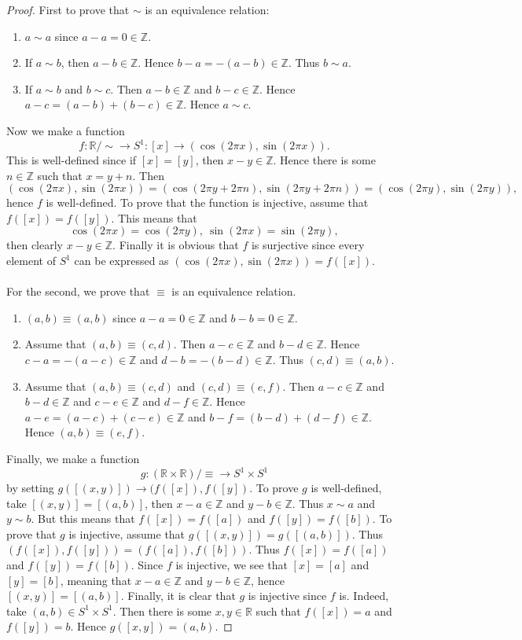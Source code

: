 \documentclass[a4paper, 11pt]{book}
\theoremstyle{plain}
\theoremstyle{plain}
\begin{document}
\begin{proof}
First to prove that $\sim$ is an equivalence relation:
\begin{enumerate}
\item $a\sim a$ since $a-a=0\in \mathbb{Z}$.
\item If $a\sim b$, then $a-b\in \mathbb{Z}$. Hence $b-a = -(a-b)\in \mathbb{Z}$. Thus $b\sim a$.
\item If $a\sim b$ and $b\sim c$. Then $a-b\in \mathbb{Z}$ and $b-c\in \mathbb{Z}$. Hence $a-c=(a-b)+(b-c)\in \mathbb{Z}$. Hence $a\sim c$.
\end{enumerate}
Now we make a function
$$f:\mathbb{R}/\sim\rightarrow S^1:[x]\rightarrow (\cos(2\pi x), \sin(2\pi x)).$$
This is well-defined since if $[x]=[y]$, then $x-y\in \mathbb{Z}$. Hence there is some $n\in \mathbb{Z}$ such that $x=y+n$. Then
$$(\cos(2\pi x), \sin(2\pi x)) = (\cos(2\pi y + 2\pi n), \sin(2\pi y  + 2\pi n)) = (\cos(2\pi y), \sin(2\pi y)),$$
hence $f$ is well-defined. To prove that the function is injective, assume that $f([x]) = f([y])$. This means that 
$$\cos(2\pi x) = \cos(2\pi y),~\sin(2\pi x) = \sin(2\pi y),$$
then clearly $x-y\in \mathbb{Z}$. Finally it is obvious that $f$ is surjective since every element of $S^1$ can be expressed as $(\cos(2\pi x), \sin(2\pi x)) = f([x])$.\\\\

For the second, we prove that $\equiv$ is an equivalence relation.
\begin{enumerate}
\item $(a,b)\equiv (a,b)$ since $a-a=0\in \mathbb{Z}$ and $b-b=0\in \mathbb{Z}$.
\item Assume that $(a,b)\equiv (c,d)$. Then $a-c\in \mathbb{Z}$ and $b-d\in \mathbb{Z}$. Hence $c-a = -(a-c)\in \mathbb{Z}$ and $d-b = -(b-d)\in \mathbb{Z}$. Thus $(c,d)\equiv (a,b)$.
\item Assume that $(a,b)\equiv (c,d)$ and $(c,d)\equiv (e,f)$. Then $a-c\in \mathbb{Z}$ and $b-d\in \mathbb{Z}$ and $c-e\in \mathbb{Z}$ and $d-f\in \mathbb{Z}$. Hence $a-e = (a-c)+(c-e)\in \mathbb{Z}$ and $b-f = (b-d)+(d-f)\in \mathbb{Z}$. Hence $(a,b)\equiv (e,f)$.
\end{enumerate}
Finally, we make a function
$$g:(\mathbb{R}\times \mathbb{R})/\equiv \rightarrow S^1\times S^1$$
by setting $g([(x,y)])\rightarrow (f([x]), f([y])$. To prove $g$ is well-defined, take $[(x,y)] = [(a,b)]$, then $x-a\in \mathbb{Z}$ and $y-b\in \mathbb{Z}$. Thus $x\sim a$ and $y\sim b$. But this means that $f([x]) = f([a])$ and $f([y]) = f([b])$. To prove that $g$ is injective, assume that $g([(x,y)]) = g([(a,b)])$. Thus $(f([x]), f([y])) = (f([a]), f([b]))$. Thus $f([x]) = f([a])$ and $f([y]) = f([b])$. Since $f$ is injective, we see that $[x]=[a]$ and $[y] = [b]$, meaning that $x-a\in \mathbb{Z}$ and $y-b\in \mathbb{Z}$, hence $[(x,y)]=[(a,b)]$. Finally, it is clear that $g$ is injective since $f$ is. Indeed, take $(a,b)\in S^1\times S^1$. Then there is some $x,y\in \mathbb{R}$ such that $f([x]) = a$ and $f([y]) = b$. Hence $g([x,y]) = (a,b)$.
\end{proof}
\end{document}
